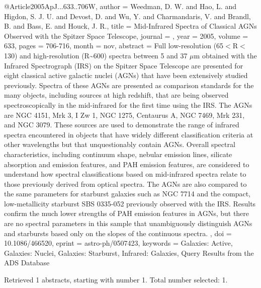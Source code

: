 \documentclass[longauth]{aa}
\begin{document}
{{{{{{{{{{@Article{2005ApJ...633..706W,
  author   = {Weedman, D. W. and Hao, L. and Higdon, S. J. U. and Devost, D. and Wu, Y. and Charmandaris, V. and Brandl, B. and Bass, E. and Houck, J. R.},
  title    = {Mid-Infrared Spectra of Classical AGNs Observed with the Spitzer Space Telescope},
  journal  = {\apj},
  year     = {2005},
  volume   = {633},
  pages    = {706-716},
  month    = nov,
  abstract = {Full low-resolution (65$\lt$R$\lt$130) and high-resolution (R\~{}600) spectra
between 5 and 37 {$\mu$}m obtained with the Infrared Spectrograph (IRS) on
the Spitzer Space Telescope are presented for eight classical active
galactic nuclei (AGNs) that have been extensively studied previously.
Spectra of these AGNs are presented as comparison standards for the many
objects, including sources at high redshift, that are being observed
spectroscopically in the mid-infrared for the first time using the IRS.
The AGNs are NGC 4151, Mrk 3, I Zw 1, NGC 1275, Centaurus A, NGC 7469,
Mrk 231, and NGC 3079. These sources are used to demonstrate the range
of infrared spectra encountered in objects that have widely different
classification criteria at other wavelengths but that unquestionably
contain AGNs. Overall spectral characteristics, including continuum
shape, nebular emission lines, silicate absorption and emission
features, and PAH emission features, are considered to understand how
spectral classifications based on mid-infrared spectra relate to those
previously derived from optical spectra. The AGNs are also compared to
the same parameters for starburst galaxies such as NGC 7714 and the
compact, low-metallicity starburst SBS 0335-052 previously observed with
the IRS. Results confirm the much lower strengths of PAH emission
features in AGNs, but there are no spectral parameters in this sample
that unambiguously distinguish AGNs and starbursts based only on the
slopes of the continuous spectra.
},
  doi      = {10.1086/466520},
  eprint   = {astro-ph/0507423},
  keywords = {Galaxies: Active, Galaxies: Nuclei, Galaxies: Starburst, Infrared: Galaxies},
}
Query Results from the ADS Database


Retrieved 1 abstracts, starting with number 1.  Total number selected: 1.

}}}}}}}}}}
\end{document}
